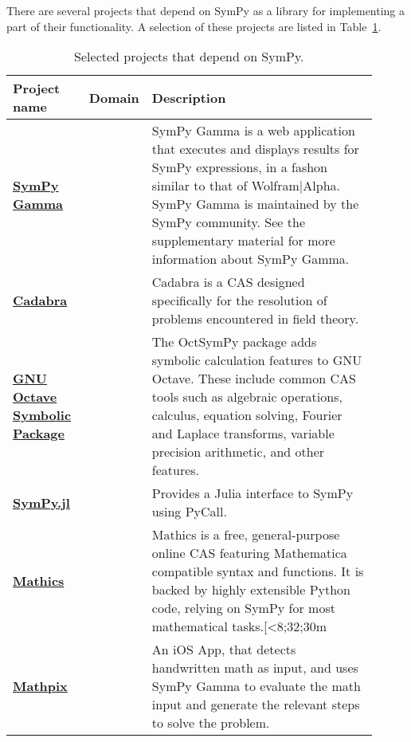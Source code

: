 There are several projects that depend on SymPy as a library for implementing
a part of their functionality. A selection of these projects are listed in
Table~\ref{projects-table}.

\begin{longtable}[htbc]{>{\raggedright}p{0.14\linewidth}p{0.14\linewidth}p{0.63\linewidth}}
\caption{Selected projects that depend on SymPy.\label{projects-table}}\\
\toprule
\textbf{Project name} & \textbf{Domain} & \textbf{Description} \\
\midrule

\href{http://sympygamma.com/}{\textbf{SymPy Gamma}} &  & SymPy Gamma is a
  web application that executes and displays results for SymPy expressions, in
  a fashon similar to that of Wolfram|Alpha. SymPy Gamma is maintained by the
  SymPy community. See the supplementary material for more information about
  SymPy Gamma. \\

\href{http://cadabra.science/index.html}{\textbf{Cadabra}}~\cite{Peeters2007cadabra} &  &
  Cadabra is a CAS designed specifically for the resolution of problems
  encountered in field theory. \\

\href{https://github.com/cbm755/octsympy}{\textbf{GNU Octave Symbolic Package}}~\cite{OctSymPy} &  &
  The OctSymPy package adds symbolic calculation features
  to GNU Octave. These include common CAS tools such
  as algebraic operations, calculus, equation solving, Fourier and
  Laplace transforms, variable precision arithmetic, and other features. \\

\href{https://github.com/jverzani/SymPy.jl}{\textbf{SymPy.jl}}~\cite{SymPy.jl} &  &
  Provides a Julia interface to SymPy using PyCall. \\

\href{https://mathics.github.io/}{\textbf{Mathics}}~\cite{Mathics} &  & Mathics is a
  free, general-purpose online CAS featuring Mathematica compatible
  syntax and functions. It is backed by highly extensible Python code,
  relying on SymPy for most mathematical tasks.[<8;32;30m \\

\href{http://mathpix.com/}{\textbf{Mathpix}}~\cite{Mathpix} &  & An iOS App, that detects handwritten math as input, and uses
  SymPy Gamma to evaluate the math input and generate the relevant
  steps to solve the problem. \\


\end{longtable}
